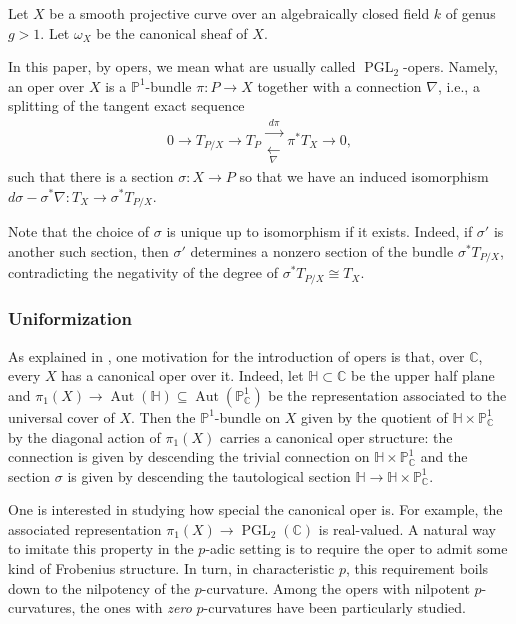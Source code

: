 \documentclass[11pt]{amsart}
\begin{document}
Let $X$ be a smooth projective curve over an algebraically closed field $k$ of genus $g>1$.
Let $\omega_X$ be the canonical sheaf of $X$.

In this paper, by opers, we mean what are usually called $\operatorname{PGL}_2$-opers.
Namely, an oper over $X$ is a $\mathbb{P}^1$-bundle $\pi: P\to X$ together with a connection $\nabla$, i.e., a splitting of the tangent exact sequence 
\[
0\longrightarrow T_{P/X}
\longrightarrow T_P
\mathrel{\substack{\xrightarrow{\ d\pi\ }\\[-0.6ex]\xleftarrow[\ \nabla\ ]{}}}
\pi^*T_X
\longrightarrow 0,
\]such that there is a section $\sigma: X\to P$ so that we have an induced isomorphism $d\sigma-\sigma^*\nabla:T_X\to \sigma^*T_{P/X}$.

Note that the choice of $\sigma$ is unique up to isomorphism if it exists.
Indeed, if $\sigma'$ is another such section, then $\sigma'$ determines a nonzero section of the bundle $\sigma^*T_{P/X}$, contradicting the negativity of the degree of $\sigma^*T_{P/X}\cong T_X$.

\subsubsection*{Uniformization}\;

As explained in \cite[\S1]{MocIntro}, one
 motivation for the introduction of opers is that, over $\mathbb{C}$, every $X$ has a canonical oper over it. Indeed, let $\mathbb{H}\subset \mathbb{C}$ be the upper half plane and $\pi_1(X)\to \operatorname{Aut}(\mathbb{H})\subseteq \operatorname{Aut}(\mathbb{P}^1_{\mathbb{C}})$ be the representation associated to the universal cover of $X$.
Then the $\mathbb{P}^1$-bundle on $X$ given by the quotient of $\mathbb{H}\times \mathbb{P}^1_{\mathbb{C}}$ by the diagonal action of $\pi_1(X)$ carries a canonical oper structure: the connection is given by descending the trivial connection on $\mathbb{H}\times \mathbb{P}^1_{\mathbb{C}}$ and the section $\sigma$ is given by descending the tautological section $\mathbb{H}\to \mathbb{H}\times \mathbb{P}^1_{\mathbb{C}}$.

One is interested in studying how special the canonical oper is. For example, the associated representation $\pi_1(X)\to \operatorname{PGL}_2(\mathbb{C})$ is real-valued.
A natural way to imitate this property in the $p$-adic setting is to require the oper to admit some kind of Frobenius structure.
In turn, in characteristic $p$, this requirement boils down to the nilpotency of the $p$-curvature.
Among the opers with nilpotent $p$-curvatures, the ones with \textit{zero} $p$-curvatures have been particularly studied.
\end{document}
